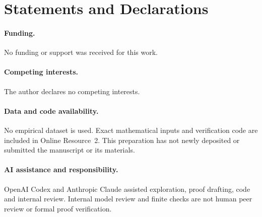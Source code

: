 \documentclass[11pt]{article}
\theoremstyle{remark}
\begin{document}
\section*{Statements and Declarations}
\paragraph{Funding.} No funding or support was received for this work.
\paragraph{Competing interests.} The author declares no competing interests.
\paragraph{Data and code availability.}
No empirical dataset is used. Exact mathematical inputs and verification code
are included in Online Resource~2. This preparation has not newly deposited
or submitted the manuscript or its materials.
\paragraph{AI assistance and responsibility.}
OpenAI Codex and Anthropic Claude assisted exploration, proof drafting,
code and internal review. Internal model review and finite checks are not
human peer review or formal proof verification.
\end{document}

